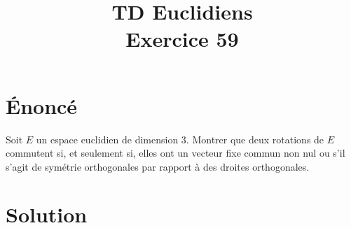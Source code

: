 \documentclass[french]{article}
\title{TD Euclidiens\\ Exercice 59}
\date{}
\begin{document}
\maketitle

\section{Énoncé}
Soit $E$ un espace euclidien de dimension $3$. Montrer que deux rotations de $E$ commutent si, et seulement si, elles ont un vecteur fixe commun non nul ou s'il s'agit de symétrie orthogonales par rapport à des droites orthogonales.
\section{Solution}
\end{document}
